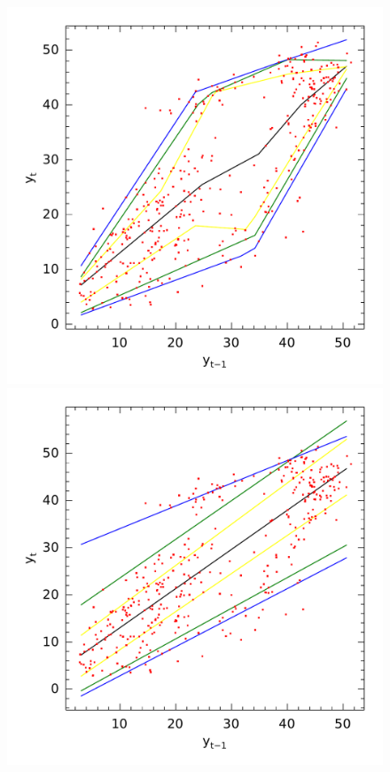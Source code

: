 \begin{figure}[htp]
\begin{minipage}[t]{0.4\linewidth}
\begin{minipage}[t]{\linewidth}
    \end{minipage}
    \begin{minipage}[b]{\linewidth}
      \centering     \includegraphics[width=\textwidth]{Figuras/npqar/icaraizinho-crossing-10}
    \end{minipage}
     \begin{minipage}[b]{\linewidth}
      \centering     \includegraphics[width=\textwidth]{Figuras/npqar/icaraizinho-crossing-200}

\end{minipage}
\end{minipage}
\end{figure}
